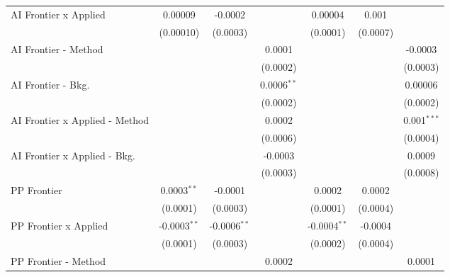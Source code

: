 \begin{tabular}{lcccccc}
   AI Frontier x Applied          & 0.00009         & -0.0002         &                 & 0.00004         & 0.001          &   \\   
                                  & (0.00010)       & (0.0003)        &                 & (0.0001)        & (0.0007)       &   \\   
   AI Frontier - Method           &                 &                 & 0.0001          &                 &                & -0.0003\\   
                                  &                 &                 & (0.0002)        &                 &                & (0.0003)\\   
   AI Frontier - Bkg.             &                 &                 & 0.0006$^{**}$   &                 &                & 0.00006\\   
                                  &                 &                 & (0.0002)        &                 &                & (0.0002)\\   
   AI Frontier x Applied - Method &                 &                 & 0.0002          &                 &                & 0.001$^{***}$\\   
                                  &                 &                 & (0.0006)        &                 &                & (0.0004)\\   
   AI Frontier x Applied - Bkg.   &                 &                 & -0.0003         &                 &                & 0.0009\\   
                                  &                 &                 & (0.0003)        &                 &                & (0.0008)\\   
   PP Frontier                    & 0.0003$^{**}$   & -0.0001         &                 & 0.0002          & 0.0002         &   \\   
                                  & (0.0001)        & (0.0003)        &                 & (0.0001)        & (0.0004)       &   \\   
   PP Frontier x Applied          & -0.0003$^{**}$  & -0.0006$^{**}$  &                 & -0.0004$^{**}$  & -0.0004        &   \\   
                                  & (0.0001)        & (0.0003)        &                 & (0.0002)        & (0.0004)       &   \\   
   PP Frontier - Method           &                 &                 & 0.0002          &                 &                & 0.0001\\   

\end{tabular}
